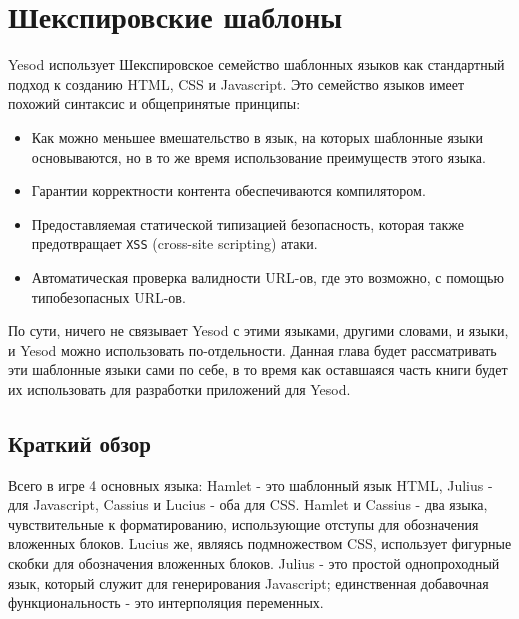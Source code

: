 \chapter{Шекспировские шаблоны}\label{ch:shakespeare}

Yesod использует Шекспировское семейство шаблонных языков как стандартный 
подход к созданию HTML, CSS и Javascript. Это семейство языков имеет похожий 
синтаксис и общепринятые принципы: 

\begin{itemize}
\item Как можно меньшее вмешательство в язык, на которых шаблонные языки 
основываются, но в то же время использование преимуществ этого языка.
\item Гарантии корректности контента обеспечиваются компилятором.
\item Предоставляемая статической типизацией безопасность, которая также 
предотвращает \texttt{XSS} (cross-site scripting) атаки.
\item Автоматическая проверка валидности URL-ов, где это возможно, с помощью 
типобезопасных URL-ов.
\end{itemize}

По сути, ничего не связывает Yesod с этими языками, другими словами, и языки, 
и Yesod можно использовать по-отдельности. Данная глава будет рассматривать 
эти шаблонные языки сами по себе, в то время как оставшаяся часть книги 
будет их использовать для разработки приложений для Yesod.

\section{Краткий обзор}

Всего в игре 4 основных языка: Hamlet - это шаблонный язык HTML, 
Julius - для Javascript, Cassius и Lucius - оба для CSS. Hamlet и Cassius - 
два языка, чувствительные к форматированию, использующие отступы для 
обозначения вложенных блоков. Lucius же, являясь подмножеством CSS, использует
фигурные скобки для обозначения вложенных блоков. 
Julius - это простой однопроходный язык, который служит для 
генерирования Javascript; единственная добавочная функциональность - это 
интерполяция переменных.

